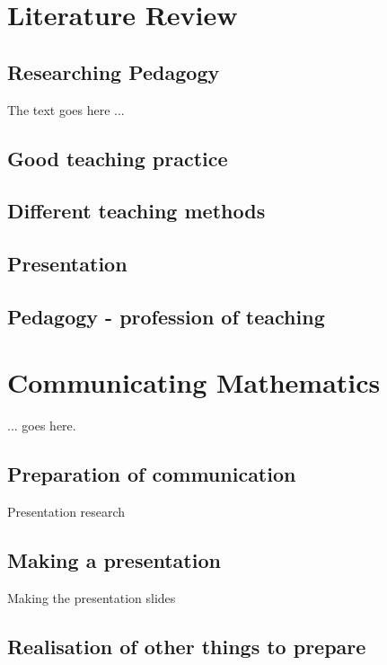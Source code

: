 \documentclass[12pt, a4paper,oneside]{book}
\numberwithin{equation}{section}
\begin{document}
\chapter{Literature Review}\label{ch:x}

\section{Researching Pedagogy}\label{sec:x.x}

The text goes here ...

\section{Good teaching practice}\label{sec:x.x}

\section{Different teaching methods}\label{sec:x.x}

\section{Presentation}\label{sec:x.x}

\section{Pedagogy - profession of teaching}\label{sec:x.x}


\chapter{Communicating Mathematics}\label{ch:x.x}

... goes here.

\section{Preparation of communication}\label{sec:x.x}

Presentation research

\section{Making a presentation}\label{sec:x.x}

Making the presentation slides

\section{Realisation of other things to prepare}\label{sec:x.x}
\end{document}
